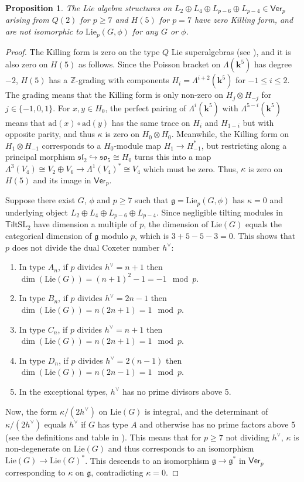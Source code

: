 \documentclass[11pt,a4paper,reqno]{amsart}
\newtheorem{prop}[theorem]{Proposition}
\theoremstyle{definition}
\newcommand{\bk}{\mathbf{k}}
\numberwithin{equation}{section}
\newcommand{\Ver}{\mathsf{Ver}}
\newcommand{\mZ}{\mathbb{Z}}
\newcommand{\fg}{\mathfrak{g}}
\newcommand{\fsl}{\mathfrak{sl}}
\newcommand{\fso}{\mathfrak{so}}
\newcommand{\Lie}{\mathrm{Lie}}
\newcommand{\Tilt}{\mathsf{Tilt}}
\newcommand{\ad}{\mathrm{ad}}
\newcommand{\SL}{\mathrm{SL}}
\begin{document}
\begin{prop}\label{PropHQ}
The Lie algebra structures on $L_2\oplus L_4\oplus L_{p-6}\oplus L_{p-4}\in\Ver_p$ arising from $Q(2)$ for $p\geq7$ and $H(5)$ for $p=7$ have zero Killing form, and are not isomorphic to $\Lie_p(G,\phi)$ for any $G$ or $\phi$.
\end{prop}

\begin{proof}
The Killing form is zero on the type $Q$ Lie superalgebras (see \cite[\S2.4]{Kac}), and it is also zero on $H(5)$ as follows. Since the Poisson bracket on $\Lambda(\bk^5)$ has degree $-2$, $H(5)$ has a $\mZ$-grading with components $H_i=\Lambda^{i+2}(\bk^5)$ for $-1\leq i\leq 2$. The grading means that the Killing form is only non-zero on $H_j\otimes H_{-j}$ for $j\in\{-1,0,1\}$. For $x,y\in H_0$, the perfect pairing of $\Lambda^i(\bk^5)$ with $\Lambda^{5-i}(\bk^5)$ means that $\ad(x)\circ\ad(y)$ has the same trace on $H_i$ and $H_{1-i}$ but with opposite parity, and thus $\kappa$ is zero on $H_0\otimes H_0$. Meanwhile, the Killing form on $H_1\otimes H_{-1}$ corresponds to a $H_0$-module map $H_1\to H_{-1}^*$, but restricting along a principal morphism $\fsl_2\hookrightarrow\fso_5\cong H_0$ turns this into a map $\Lambda^3(V_4)\cong V_2\oplus V_6\to\Lambda^1(V_4)^*\cong V_4$ which must be zero. Thus, $\kappa$ is zero on $H(5)$ and its image in $\Ver_p$.

Suppose there exist $G$, $\phi$ and $p\geq7$ such that $\fg=\Lie_p(G,\phi)$ has $\kappa=0$ and underlying object $L_2\oplus L_4\oplus L_{p-6}\oplus L_{p-4}$. Since negligible tilting modules in $\Tilt\SL_2$ have dimension a multiple of $p$, the dimension of $\Lie(G)$ equals the categorical dimension of $\fg$ modulo $p$, which is $3+5-5-3=0$. This shows that $p$ does not divide the dual Coxeter number $h^\vee$:
\begin{enumerate}
\item In type $A_n$, if $p$ divides $h^\vee=n+1$ then $\dim(\Lie(G))=(n+1)^2-1=-1\mod p$.
\item In type $B_n$, if $p$ divides $h^\vee=2n-1$ then $\dim(\Lie(G))=n(2n+1)=1\mod p$.
\item In type $C_n$, if $p$ divides $h^\vee=n+1$ then $\dim(\Lie(G))=n(2n+1)=1\mod p$.
\item In type $D_n$, if $p$ divides $h^\vee=2(n-1)$ then $\dim(\Lie(G))=n(2n-1)=1\mod p$.
\item In the exceptional types, $h^\vee$ has no prime divisors above 5.
\end{enumerate}
Now, the form $\kappa/(2h^\vee)$ on $\Lie(G)$ is integral, and the determinant of $\kappa/(2h^\vee)$ equals $h^\vee$ if $G$ has type $A$ and otherwise has no prime factors above 5 (see the definitions and table in \cite[\S 5]{GN}). This means that for $p\geq7$ not dividing $h^\vee$, $\kappa$ is non-degenerate on $\Lie(G)$ and thus corresponds to an isomorphism $\Lie(G)\to\Lie(G)^*$. This descends to an isomorphism $\fg\to\fg^*$ in $\Ver_p$ corresponding to $\kappa$ on $\fg$, contradicting $\kappa=0$.
\end{proof}
\end{document}
